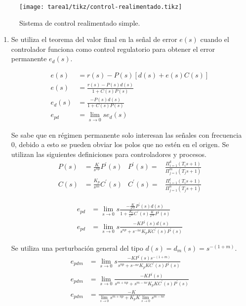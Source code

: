 \begin{ejercicio}
  \begin{figure}[H]
      \centering
      \texttt{[image: tarea1/tikz/control-realimentado.tikz]}
      \caption{Sistema de control realimentado simple.}
      \label{img:ejercicio1}
  \end{figure}
  \begin{enumerate}
    \item
    Se utiliza el teorema del valor final en la señal de error $e(s)$ cuando el controlador funciona como control regulatorio para obtener el error permanente $e_d(s)$.

    \begin{align*}
      e(s) &= r(s) - P(s)\left[d(s)+e(s) C(s)\right]
      \\ \tag{Señal de error}
      e(s) &= \frac{r(s) - P(s)d(s)}{1+C(s) P(s)}
      \\ \tag{Error de control regulatorio}
      e_d(s) &= \frac{-P(s) d(s)}{1+C(s)P(s)}
      \\ \tag{Teorema del valor final}
      e_{pd} &= \lim_{s\rightarrow 0} s e_d(s)
    \end{align*}

    Se sabe que en régimen permanente solo interesan las señales con frecuencia 0, debido a esto se pueden obviar los polos que no estén en el origen. Se utilizan las siguientes definiciones para controladores y procesos.
    \begin{align*}
      P(s) &= \frac{K}{s^{np}}P^{'}(s) & P^{'}(s) =& \frac{\Pi_{i=1}^{k}(T_i s +1)}{\Pi_{j=1}^{m}(T_j s +1)}
      \\
      C(s) &= \frac{K_p}{s^{nc}}C^{'}(s) & C^{'}(s) =& \frac{\Pi_{i=1}^{l}(T_i s +1)}{\Pi_{j=1}^{n}(T_j s +1)}
    \end{align*}

    \begin{align*}
      e_{pd} &= \lim_{s\rightarrow 0} s \frac{-\frac{K}{s^{np}}P^{'}(s) d(s)}
      {1+ \frac{K_p}{s^{nc}}C^{'}(s) \frac{K}{s^{np}}P^{'}(s)}
      \\
      e_{pd} &= \lim_{s\rightarrow 0} s \frac{-K P^{'}(s) d(s)}
      {s^{np} + s^{-nc} K_p K C^{'}(s) P^{'}(s)}
    \end{align*}

    Se utiliza una perturbación general del tipo $d(s)=d_m(s)=s^{-(1+m)}$.
    \begin{align*}
      e_{pdm} &= \lim_{s\rightarrow 0} s \frac{-K P^{'}(s) s^{-(1+m)}}
      {s^{np} + s^{-nc} K_p K C^{'}(s) P^{'}(s)}
      \\
      e_{pdm} &= \lim_{s\rightarrow 0} \frac{-K P^{'}(s)}
      {s^{m+np} + s^{m-nc} K_p K C^{'}(s) P^{'}(s)}
      \\ \tag{error permanente ante perturbación general}
      e_{pdm} &= \frac{-K}
      {\lim_{s\rightarrow 0}s^{m+np} + K_p K\lim_{s\rightarrow 0} s^{m-nc}}
    \end{align*}


\end{enumerate}
\end{ejercicio}

